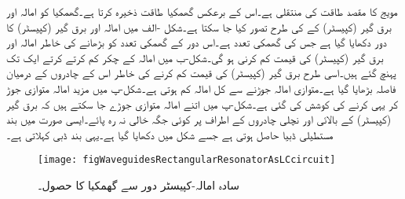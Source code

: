 مویج کا مقصد طاقت کی منتقلی ہے۔اس کے برعکس گھمکیا طاقت ذخیرہ کرتا ہے۔گھمکیا کو امالہ اور برق گیر (کپیسٹر)  کے  کی طرح تصور کیا جا سکتا ہے۔شکل -الف میں امالہ اور برق گیر (کپیسٹر)  کا دور  دکھایا گیا ہے  جس کی گھمکی تعدد  ہے۔اس دور کے گھمکی تعدد کو بڑھانے کی خاطر امالہ اور برق گیر (کپیسٹر)  کی قیمت کم کرنی ہو گی۔شکل-ب میں امالہ کے چکر کم کرتے کرتے ایک تک پہنچ گئے ہیں۔اسی طرح برق گیر (کپیسٹر)  کی قیمت کم کرنے کی خاطر اس کے چادروں کے درمیان فاصلہ بڑھایا گیا ہے۔متوازی امالہ جوڑنے سے کل امالہ کم ہوتی ہے۔شکل-پ میں مزید امالہ متوازی جوڑ کر یہی کرنے کی کوشش کی گئی ہے۔شکل-پ میں اتنے امالہ متوازی جوڑے جا سکتے ہیں کہ برق گیر (کپیسٹر)  کے بالائی اور نچلی چادروں کے اطراف پر کوئی جگہ خالی نہ رہ پائے۔ایسی صورت میں بند مستطیلی ڈبیا حاصل ہوتی ہے جسے شکل  میں دکھایا گیا ہے۔یہی بند ڈبی   کہلاتی ہے۔ 

\begin{figure}
\centering
\texttt{[image: figWaveguidesRectangularResonatorAsLCcircuit]}
\caption{سادہ امالہ-کپیسٹر دور سے گھمکیا کا حصول۔}
\label{شکل_مویج_امالہ_کپیسٹر_سے_گھمکیا}
\end{figure}

